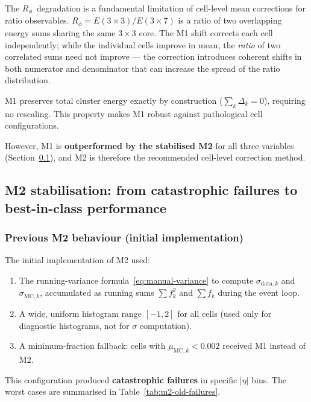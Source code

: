 \documentclass[11pt,a4paper]{article}
\newcommand{\Rphi}{\ensuremath{R_{\phi}}}
\newcommand{\abseta}{\ensuremath{|\eta|}}
\begin{document}
The \Rphi\ degradation is a fundamental limitation of cell-level mean
corrections for ratio observables.
$R_\phi = E(3\!\times\!3) / E(3\!\times\!7)$ is a ratio of two
overlapping energy sums sharing the same $3\!\times\!3$ core.  The M1
shift corrects each cell independently; while the individual cells
improve in mean, the \emph{ratio} of two correlated sums need not
improve --- the correction introduces coherent shifts in both numerator
and denominator that can increase the spread of the ratio distribution.

M1 preserves total cluster energy exactly by construction
($\sum_k \Delta_k = 0$), requiring no rescaling.  This property makes
M1 robust against pathological cell configurations.

However, M1 is \textbf{outperformed by the stabilised M2} for all three
variables (Section~\ref{sec:disc-m2-stabilisation}), and M2 is therefore
the recommended cell-level correction method.

\subsection{M2 stabilisation: from catastrophic failures to best-in-class performance}
\label{sec:disc-m2-stabilisation}

\subsubsection{Previous M2 behaviour (initial implementation)}
\label{sec:disc-m2-old}

The initial implementation of M2 used:
\begin{enumerate}
  \item The running-variance formula~\eqref{eq:manual-variance} to
        compute $\sigma_{\text{data},k}$ and $\sigma_{\text{MC},k}$,
        accumulated as running sums $\sum f_k^2$ and $\sum f_k$ during
        the event loop.
  \item A wide, uniform histogram range $[-1, 2]$ for all cells (used
        only for diagnostic histograms, not for $\sigma$ computation).
  \item A minimum-fraction fallback: cells with
        $\mu_{\text{MC},k} < 0.002$ received M1 instead of M2.
\end{enumerate}

This configuration produced \textbf{catastrophic failures} in specific
$\abseta$ bins.  The worst cases are summarised in
Table~\ref{tab:m2-old-failures}.
\end{document}
